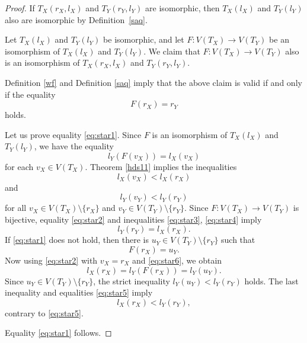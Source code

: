 \documentclass{raex}
\theoremstyle{definition}
\theoremstyle{remark}
\numberwithin{equation}{section}
\begin{document}
\begin{proof}
If $T_X(r_X,l_X)$ and $T_Y(r_Y,l_Y)$ are isomorphic, then $T_X(l_X)$ and $T_Y(l_Y)$ also are isomorphic by Definition~\ref{saq}.

Let $T_X(l_X)$ and $T_Y(l_Y)$ be isomorphic, and let
\(
F:V(T_X)\to V(T_Y)
\)
be an isomorphism of $T_X(l_X)$ and $T_Y(l_Y)$. We claim that $F:V(T_X)\to V(T_Y)$ also is an isomorphism of $T_X(r_X,l_X)$ and $T_Y(r_Y,l_Y)$.

Definition \ref{wf} and Definition \ref{saq} imply that the above claim is valid if and only if the equality
\begin{equation}
F(r_X)=r_Y
\label{eq:star1}
\end{equation}
holds.

Let us prove equality \eqref{eq:star1}. Since $F$ is an isomorphism of $T_X(l_X)$ and $T_Y(l_Y)$, we have the equality
\begin{equation}
l_Y(F(v_X))=l_X(v_X)
\label{eq:star2}
\end{equation}
for each $v_X\in V(T_X)$.
Theorem \ref{hds11} implies the inequalities
\begin{equation}
l_X(v_X)<l_X(r_X)
\label{eq:star3}
\end{equation}
and
\begin{equation}
l_Y(v_Y)< l_Y(r_Y)
\label{eq:star4}
\end{equation}
for all $v_X\in V(T_X)\setminus\{r_X\}$ and $v_Y\in V(T_Y)\setminus\{r_Y\}$.
Since $F:V(T_X)\to V(T_Y)$ is bijective, equality \eqref{eq:star2} and inequalities \eqref{eq:star3}, \eqref{eq:star4} imply
\begin{equation}
l_Y(r_Y)=l_X(r_X).
\label{eq:star5}
\end{equation}
If \eqref{eq:star1} does not hold, then there is $u_Y\in V(T_Y)\setminus\{r_Y\}$ such that
\begin{equation}
F(r_X)=u_Y.
\label{eq:star6}
\end{equation}
Now using \eqref{eq:star2} with $v_X=r_X$ and \eqref{eq:star6}, we obtain
\begin{equation*}
l_X(r_X)=l_Y(F(r_X))=l_Y(u_Y).
\end{equation*}
Since $u_Y\in V(T_Y)\setminus\{r_Y\}$, the strict inequality
\(
l_Y(u_Y)<l_Y(r_Y)
\)
holds. The last inequality and equalities \eqref{eq:star5} imply
\begin{equation*}
l_X(r_X)<l_Y(r_Y),
\end{equation*}
contrary to \eqref{eq:star5}. 

Equality \eqref{eq:star1} follows.
\end{proof}
\end{document}
